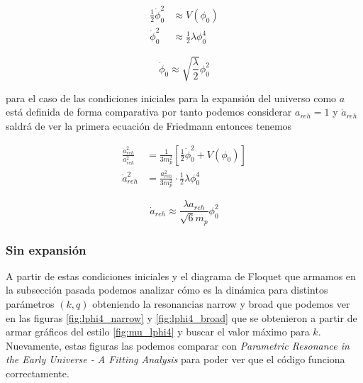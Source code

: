 \begin{equation*}
    \begin{split}
        \frac{1}{2} \dot{\phi}^2_0 &\approx V(\phi_0)\\
        \dot{\phi}^2_0 &\approx \frac{1}{2} \lambda \phi_0^4
    \end{split}
\end{equation*}

\begin{equation}
    \dot{\phi}_0 \approx \sqrt{\frac{\lambda}{2}} \phi_0^2
\end{equation}

\noindent
para el caso de las condiciones iniciales para la expansión del universo como $a$ está definida de forma comparativa por tanto podemos considerar $a_{reh} = 1$ y $\dot{a}_{reh}$ saldrá de ver la primera ecuación de Friedmann entonces tenemos

\begin{equation*}
    \begin{split}
        \frac{\dot{a}_{reh}^2}{a_{reh}^2} &= \frac{1}{3 m_p^2} \left[ \frac{1}{2} \dot{\phi}^2_0 + V(\phi_0) \right]\\
        \dot{a}_{reh}^2 &= \frac{a_{reh}^2}{3 m_p^2} \cdot \frac{1}{2} \lambda \phi^4_0
    \end{split}
\end{equation*}

\begin{equation}
    \dot{a}_{reh} \approx \frac{\lambda a_{reh}}{\sqrt{6} m_p} \phi_0^2    
\end{equation}

\subsubsection{Sin expansión}

A partir de estas condiciones iniciales y el diagrama de Floquet que armamos en la subsección pasada podemos analizar cómo es la dinámica para distintos parámetros $(k,q)$ obteniendo la resonancias narrow y broad que podemos ver en las figuras \ref{fig:lphi4_narrow} y \ref{fig:lphi4_broad} que se obtenieron a partir de armar gráficos del estilo \ref{fig:mu_lphi4} y buscar el valor máximo para $k$. Nuevamente, estas figuras las podemos comparar con \textit{Parametric Resonance in the Early Universe - A Fitting Analysis} para poder ver que el código funciona correctamente.

